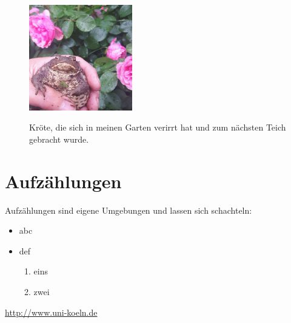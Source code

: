 \Blindtext

\begin{figure}[p]
\centering
\includegraphics[width=0.4\textwidth]{img/toad}
\label{kroete}
\caption[Kurztitel Kröte]{Kröte, die sich in meinen Garten verirrt hat und zum nächsten Teich gebracht wurde.}
\end{figure}

\Blindtext




\section{Aufzählungen}

Aufzählungen sind eigene Umgebungen und lassen sich schachteln:

\begin{itemize}
\item abc
\item def  \begin{enumerate}
\item eins
\item zwei
\end{enumerate}
\end{itemize}






\url{http://www.uni-koeln.de}

